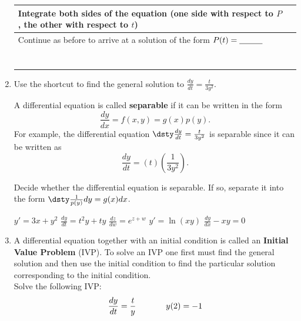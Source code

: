 \begin{enumerate}[resume]
\begin{center}
\begin{tabular}{|p{2.5in}|V|}
Integrate both sides of the equation (one side with respect to $P$, the other with respect to $t$)	  &
{} \\\hline

Continue as before to arrive at a solution of the form $P(t)=\underline{\hskip1cm}$	 	  &
{} \\
{} & {} \\
{} & {} \\
{} & {} \\
{} & {} \\
{} & {} \\
{} & {} \\
{} & {} \\ \hline
\end{tabular}
\end{center}

\item	Use the shortcut to find the general solution to  $\displaystyle \frac{dy}{dt}=\frac{t}{3y^2}$. \label{05problem5}
\vfill

\clearpage

A differential equation is called \textbf{separable} if it can be written in the form
\[ \frac{dy}{dx}=f(x,y)=g(x)p(y). \]
For example, the differential equation $\dsty \frac{dy}{dt}=\frac{t}{3y^2}$ is separable since it can be written as 
\[ \frac{dy}{dt}=(t)\left( \frac{1}{3y^2} \right).\]


\ii Decide whether the differential equation is separable.  If
so, separate it into the form $\dsty \frac{1}{p(y)} dy = g(x) dx$.

\bb
\ii $y' = 3x+y^2$ \vfill 
\ii $\displaystyle \frac{dy}{dt} = t^2y+ty$ \vfill
\ii $\displaystyle \frac{dz}{dw} = e^{z+w}$ \vfill
\ii $y'=\ln{(xy)}$ \vfill 
\ii $\displaystyle \frac{dy}{dx}-xy =0$ \vfill
\ee






\clearpage

\item	A differential equation together with an initial condition is called an \textbf{Initial Value Problem} (IVP). To solve an IVP one first must find the general solution and then use the initial condition to find the particular solution corresponding to the initial condition. \label{05problem6} \\ Solve the following IVP:    
\[ \frac{dy}{dt}=\frac{t}{y}\hspace{0.5in} y(2)=-1\]
\vfill


\end{enumerate}
